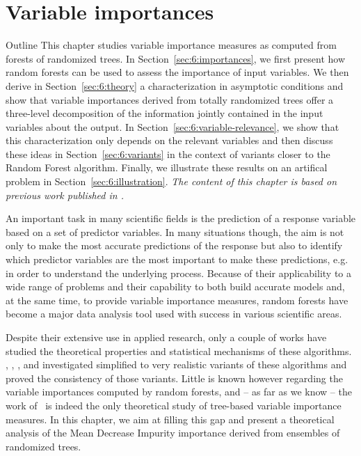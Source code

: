 \chapter{Variable importances}\label{ch:importances}

\begin{remark}{Outline}
This chapter studies variable importance measures as computed from forests of
randomized trees. In Section~\ref{sec:6:importances}, we first present how
random forests can be used to assess the importance of input variables.  We
then derive in Section~\ref{sec:6:theory} a characterization in asymptotic
conditions and show that variable importances derived from totally randomized trees
offer a three-level decomposition of the information jointly  contained in the
input variables about the output. In Section~\ref{sec:6:variable-relevance}, we
show that this  characterization only depends on the relevant variables and
then discuss these ideas in Section~\ref{sec:6:variants} in the context of
variants closer to the Random Forest algorithm. Finally, we illustrate these
results on an artifical problem in Section~\ref{sec:6:illustration}.
\textit{The content of this chapter is based on previous work published in \citep{louppe:2013}.}
\end{remark}

An important task in many scientific fields is the prediction of  a response
variable based on a set of predictor variables. In many situations though, the
aim is not only to make the most accurate predictions of the response but also
to identify which predictor variables are the most important to make these
predictions, e.g. in order to understand the underlying process. Because of
their applicability to a wide range of problems and their capability to both
build accurate models and, at the same time, to provide variable importance
measures, random forests have become a major data analysis tool used with
success in various scientific areas.

Despite their extensive use in applied research, only a couple of works have
studied the theoretical properties and statistical mechanisms of these
algorithms. \citet{zhao:2000}, \citet{breiman:2004},
\citet{biau:2008,biau:2012}, \citet{meinshausen:2006} and \citet{lin:2006}
investigated simplified to very realistic variants of these algorithms and
proved  the consistency of those variants. Little is known however regarding
the variable importances computed by random forests, and -- as far as we know
-- the work of~\citet{ishwaran:2007} is indeed the only theoretical study of
tree-based variable importance measures. In this chapter, we aim at filling
this gap and present a theoretical  analysis of the Mean Decrease Impurity
importance derived from ensembles of randomized trees.



